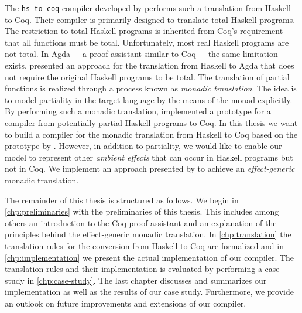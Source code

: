 The \texttt{hs-to-coq} compiler developed by \cite{SpectorZabusky:2017} performs such a translation from Haskell to Coq.
Their compiler is primarily designed to translate total Haskell programs.
The restriction to total Haskell programs is inherited from Coq's requirement that all functions must be total.
Unfortunately, most real Haskell programs are not total.
In Agda~--~a proof assistant similar to Coq~--~the same limitation exists.
\cite{Abel:2005} presented an approach for the translation from Haskell to Agda that does not require the original Haskell programs to be total.
The translation of partial functions is realized through a process known as \textit{monadic translation}.
The idea is to model partiality in the target language by the means of the  monad explicitly.
By performing such a monadic translation, \cite{Jessen:2019} implemented a prototype for a compiler from potentially partial Haskell programs to Coq.
In this thesis we want to build a compiler for the monadic translation from Haskell to Coq based on the prototype by \cite{Jessen:2019}.
However, in addition to partiality, we would like to enable our model to represent other \textit{ambient effects} \citep{Christiansen:2019} that can occur in Haskell programs but not in Coq.
We implement an approach presented by \cite{Dylus:2018} to achieve an \textit{effect-generic} monadic translation.

The remainder of this thesis is structured as follows.
We begin in \autoref{chp:preliminaries} with the preliminaries of this thesis.
This includes among others an introduction to the Coq proof assistant and an explanation of the principles behind the effect-generic monadic translation.
In \autoref{chp:translation} the translation rules for the conversion from Haskell to Coq are formalized and in \autoref{chp:implementation} we present the actual implementation of our compiler.
The translation rules and their implementation is evaluated by performing a case study in \autoref{chp:case-study}.
The last chapter discusses and summarizes our implementation as well as the results of our case study.
Furthermore, we provide an outlook on future improvements and extensions of our compiler.
